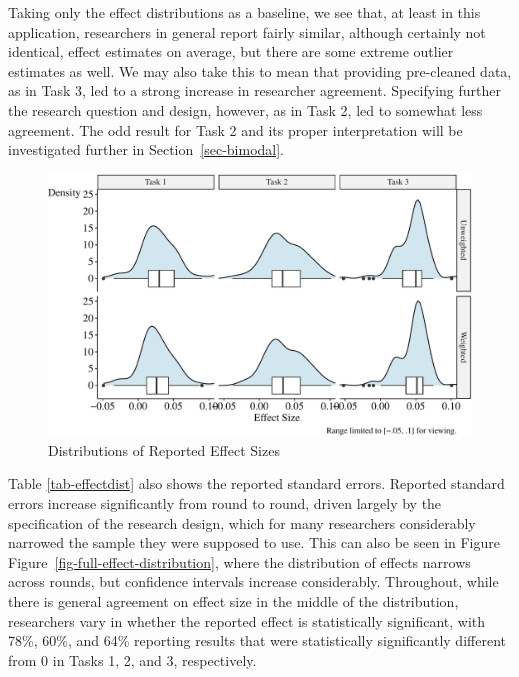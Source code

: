 \documentclass[
  letterpaper,
  DIV=11,
  numbers=noendperiod]{scrartcl}
\begin{document}
Taking only the effect distributions as a baseline, we see that, at
least in this application, researchers in general report fairly similar,
although certainly not identical, effect estimates on average, but there
are some extreme outlier estimates as well. We may also take this to
mean that providing pre-cleaned data, as in Task 3, led to a strong
increase in researcher agreement. Specifying further the research
question and design, however, as in Task 2, led to somewhat less
agreement. The odd result for Task 2 and its proper interpretation will
be investigated further in Section~\ref{sec-bimodal}.

\begin{figure}

{\centering \includegraphics{The-Sources-of-Researcher-Variation-in-Economics_files/figure-pdf/fig-effect-distributions-1.pdf}

}

\caption{\label{fig-effect-distributions}Distributions of Reported
Effect Sizes}

\end{figure}

Table \ref{tab-effectdist} also shows the reported standard errors.
Reported standard errors increase significantly from round to round,
driven largely by the specification of the research design, which for
many researchers considerably narrowed the sample they were supposed to
use. This can also be seen in Figure
Figure~\ref{fig-full-effect-distribution}, where the distribution of
effects narrows across rounds, but confidence intervals increase
considerably. Throughout, while there is general agreement on effect
size in the middle of the distribution, researchers vary in whether the
reported effect is statistically significant, with 78\%, 60\%, and 64\%
reporting results that were statistically significantly different from 0
in Tasks 1, 2, and 3, respectively.
\end{document}
